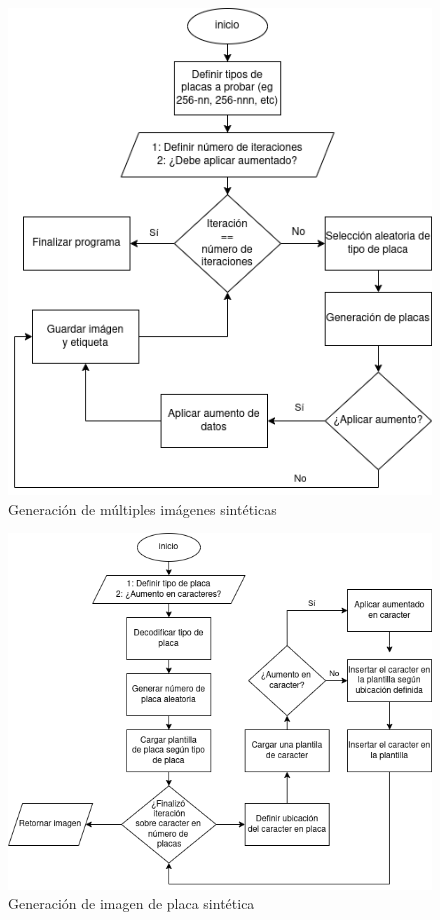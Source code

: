 \begin{figure}[H]
	\centering
	\includegraphics[width=\textwidth]{fig/proy/generacion-de-multiples-imagenes.drawio.png}
	\caption{Generación de múltiples imágenes sintéticas}
	\label{fig:diagrama-flujo-generacion-multiples-placas}
\end{figure}

\begin{figure}[H]
	\centering
	\includegraphics[width=\textwidth]{fig/proy/generacion-de-imagen-sintetica.drawio.png}
	\caption{Generación de imagen de placa sintética}
	\label{fig:diagrama-flujo-generador-placas}
\end{figure}

